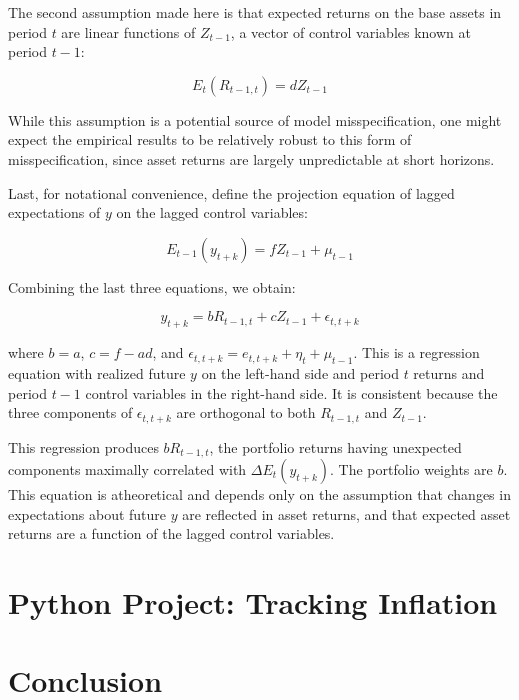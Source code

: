 The second assumption made here is that expected returns 
on the base assets in period $t$ are linear functions 
of $Z_{t-1}$, a vector of control variables known at 
period $t-1$:

\begin{equation}
    E_t(R_{t-1,t}) = d Z_{t-1}
\end{equation}

While this assumption is a potential source of model 
misspecification, one might expect the empirical results 
to be relatively robust to this form of misspecification, 
since asset returns are largely unpredictable at short 
horizons.

Last, for notational convenience, define the projection
equation of lagged expectations of $y$ on the lagged control 
variables:

\begin{equation}
    E_{t-1}(y_{t+k}) = f Z_{t-1} + \mu_{t-1}
\end{equation}

Combining the last three equations, we obtain:

\begin{equation}
    y_{t+k} = b R_{t-1,t} + c Z_{t-1} + \epsilon_{t,t+k}
\end{equation}

where $b = a$, $c = f - ad$, and $\epsilon_{t,t+k} = e_{t,t+k} + \eta_t + \mu_{t-1}$.
This is a regression equation with realized future $y$ on the 
left-hand side and period $t$ returns and period $t-1$ control
variables in the right-hand side. It is consistent because 
the three components of $\epsilon_{t,t+k}$ are orthogonal to
both $R_{t-1,t}$ and $Z_{t-1}$.

This regression produces $bR_{t-1,t}$, the portfolio returns 
having unexpected components maximally correlated with 
$\Delta E_t(y_{t+k})$. The portfolio weights are $b$.
This equation is atheoretical and depends only on the 
assumption that changes in expectations about future $y$ 
are reflected in asset returns, and that expected asset 
returns are a function of the lagged control variables.





\section{Python Project: Tracking Inflation}

\section{Conclusion}